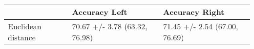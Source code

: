 \begin{tabular}{lll}
\toprule
{} &                  Accuracy Left &                 Accuracy Right \\
\midrule
Euclidean distance &  70.67 +/- 3.78 (63.32, 76.98) &  71.45 +/- 2.54 (67.00, 76.69) \\
\bottomrule
\end{tabular}

